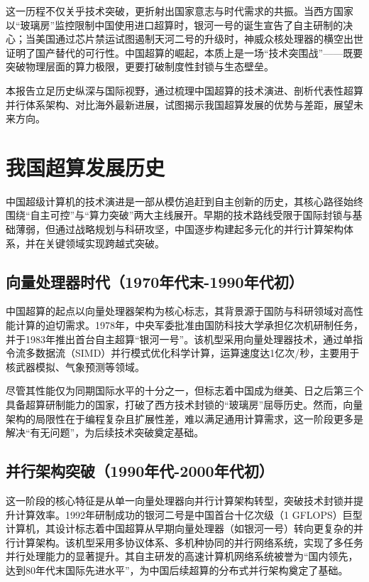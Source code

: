 \documentclass[a4paper]{article}
\begin{document}
这一历程不仅关乎技术突破，更折射出国家意志与时代需求的共振。当西方国家以“玻璃房”监控限制中国使用进口超算时，银河一号的诞生宣告了自主研制的决心；当美国通过芯片禁运试图遏制天河二号的升级时，神威众核处理器的横空出世证明了国产替代的可行性。中国超算的崛起，本质上是一场“技术突围战”——既要突破物理层面的算力极限，更要打破制度性封锁与生态壁垒。

本报告立足历史纵深与国际视野，通过梳理中国超算的技术演进、剖析代表性超算并行体系架构、对比海外最新进展，试图揭示我国超算发展的优势与差距，展望未来方向。

\section{我国超算发展历史}
中国超级计算机的技术演进是一部从模仿追赶到自主创新的历史，其核心路径始终围绕“自主可控”与“算力突破”两大主线展开。早期的技术路线受限于国际封锁与基础薄弱，但通过战略规划与科研攻坚，中国逐步构建起多元化的并行计算架构体系，并在关键领域实现跨越式突破。

\subsection{向量处理器时代（1970年代末-1990年代初）}
中国超算的起点以向量处理器架构为核心标志，其背景源于国防与科研领域对高性能计算的迫切需求。1978年，中央军委批准由国防科技大学承担亿次机研制任务，并于1983年推出首台自主超算“银河一号”。该机型采用向量处理器技术，通过单指令流多数据流（SIMD）并行模式优化科学计算，运算速度达1亿次/秒，主要用于核武器模拟、气象预测等领域。\cite{1}

尽管其性能仅为同期国际水平的十分之一，但标志着中国成为继美、日之后第三个具备超算研制能力的国家，打破了西方技术封锁的“玻璃房”屈辱历史。然而，向量架构的局限性在于编程复杂且扩展性差，难以满足通用计算需求，这一阶段更多是解决“有无问题”，为后续技术突破奠定基础。

\subsection{并行架构突破（1990年代-2000年代初）}
这一阶段的核心特征是从单一向量处理器向并行计算架构转型，突破技术封锁并提升计算效率。1992年研制成功的银河二号是中国首台十亿次级（1 GFLOPS）巨型计算机，其设计标志着中国超算从早期向量处理器（如银河一号）转向更复杂的并行计算架构。该机型采用多协议体系、多机种协同的并行网络系统，实现了多任务并行处理能力的显著提升。其自主研发的高速计算机网络系统被誉为“国内领先，达到80年代末国际先进水平”，为中国后续超算的分布式并行架构奠定了基础。
\end{document}
